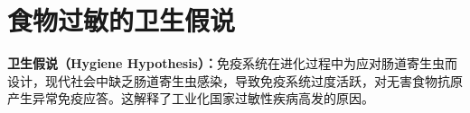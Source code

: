 \section{食物过敏的卫生假说}

\begin{tipbox}
\textbf{卫生假说（Hygiene Hypothesis）：}免疫系统在进化过程中为应对肠道寄生虫而设计，现代社会中缺乏肠道寄生虫感染，导致免疫系统过度活跃，对无害食物抗原产生异常免疫应答。这解释了工业化国家过敏性疾病高发的原因。
\end{tipbox}

